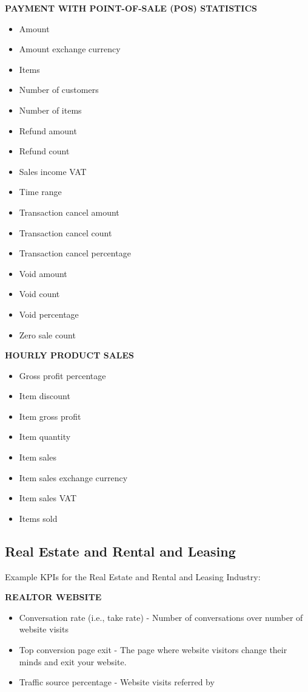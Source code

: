 \documentclass[]{book}
\providecommand{\tightlist}{%
  \setlength{\itemsep}{0pt}\setlength{\parskip}{0pt}}
\begin{document}
\textbf{PAYMENT WITH POINT-OF-SALE (POS) STATISTICS }

\begin{itemize}
\tightlist
\item
  Amount
\item
  Amount exchange currency
\item
  Items
\item
  Number of customers
\item
  Number of items
\item
  Refund amount
\item
  Refund count
\item
  Sales income VAT
\item
  Time range
\item
  Transaction cancel amount
\item
  Transaction cancel count
\item
  Transaction cancel percentage
\item
  Void amount
\item
  Void count
\item
  Void percentage
\item
  Zero sale count
\end{itemize}

\textbf{HOURLY PRODUCT SALES }

\begin{itemize}
\tightlist
\item
  Gross profit percentage
\item
  Item discount
\item
  Item gross profit
\item
  Item quantity
\item
  Item sales
\item
  Item sales exchange currency
\item
  Item sales VAT
\item
  Items sold
\end{itemize}

\subsection{Real Estate and Rental and
Leasing}\label{real-estate-and-rental-and-leasing}

Example KPIs for the Real Estate and Rental and Leasing Industry:

\textbf{REALTOR WEBSITE }

\begin{itemize}
\tightlist
\item
  Conversation rate (i.e., take rate) - Number of conversations over
  number of website visits
\item
  Top conversion page exit - The page where website visitors change
  their minds and exit your website.
\item
  Traffic source percentage - Website visits referred by
\end{itemize}
\end{document}
